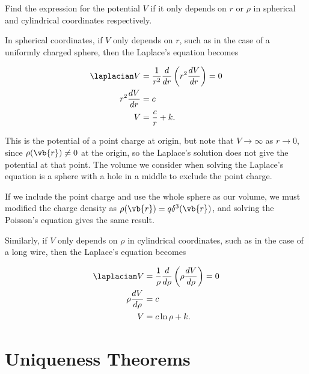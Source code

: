 \documentclass[english,a4paper,12pt]{report}
\begin{document}
{Find the expression for the potential \(V\) if it only depends on  \(r \text { or }  \rho \) in spherical and cylindrical coordinates respectively.}
{In spherical coordinates, if \(V\) only depends on \(r\), such as in the case of a uniformly charged sphere, then the Laplace's equation becomes
    
\begin{equation}
    \begin{aligned}
        \laplacian V &= \frac{1}{r^2}\frac{d}{dr} \left(r^2 \frac{dV}{dr} \right) = 0 \\ 
        r^2 \frac{dV}{dr} &= c \\
        V &= \frac{c}{r} + k . 
    \end{aligned}
\end{equation}

This is the potential of a point charge at origin, but note that \(V \to \infty\) as \(r \to 0\), since \(\rho (\vb{r} ) \neq 0\) at the origin, so the Laplace's solution does not give the potential at that point. The volume we consider when solving the Laplace's equation is a sphere with a hole in a middle to exclude the point charge. 

If we include the point charge and use the whole sphere as our volume, we must modified the charge density as \(\rho (\vb{r} ) = q \delta ^3 (\vb{r} )\), and solving the Poisson's equation gives the same result.  

Similarly, if \(V\) only depends on \(\rho \) in cylindrical coordinates, such as in the case of a long wire, then the Laplace's equation becomes 

\begin{equation}
    \begin{aligned}
        \laplacian V &= \frac{1}{\rho } \frac{d}{d \rho} \left(\rho  \frac{dV}{d \rho}\right) = 0 \\
        \rho \frac{dV}{d \rho} &= c \\
        V &= c \ln \rho + k.
    \end{aligned}	
\end{equation}} 

\section{Uniqueness Theorems}
\end{document}
